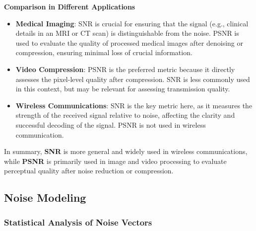\documentclass[hidelinks,12pt]{article}
\begin{document}
	 \textbf{Comparison in Different Applications}
	\begin{itemize}
		\item \textbf{Medical Imaging}: SNR is crucial for ensuring that the signal (e.g., clinical details in an MRI or CT scan) is distinguishable from the noise. PSNR is used to evaluate the quality of processed medical images after denoising or compression, ensuring minimal loss of crucial information.
		\item \textbf{Video Compression}: PSNR is the preferred metric because it directly assesses the pixel-level quality after compression. SNR is less commonly used in this context, but may be relevant for assessing transmission quality.
		\item \textbf{Wireless Communications}: SNR is the key metric here, as it measures the strength of the received signal relative to noise, affecting the clarity and successful decoding of the signal. PSNR is not used in wireless communication.
	\end{itemize}
	
	 In summary, \textbf{SNR} is more general and widely used in wireless communications, while \textbf{PSNR} is primarily used in image and video processing to evaluate perceptual quality after noise reduction or compression.
	
	
	\subsection{Noise Modeling}
	\subsubsection{Statistical Analysis of Noise Vectors}
\end{document}
